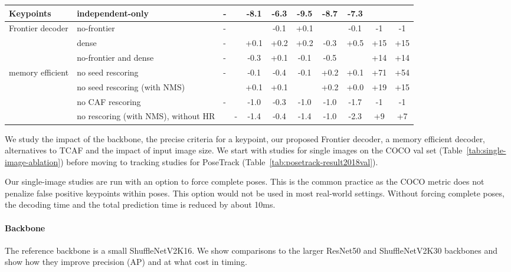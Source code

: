 \documentclass[journal]{IEEEtran}
\newcommand{\hl}[1]{#1}
\begin{document}
\begin{table*}
\begin{tabular}{|l l|H H c c c c c c c|}
    \hline

    Keypoints & independent-only
    & - &  & -8.1 & \hl{-6.3} & \hl{-9.5} & -8.7 & -7.3 &  &  \\

    \hline

    Frontier decoder & no-frontier
    & - &  &  & \hl{-0.1} & \hl{+0.1} &  & -0.1 & -1 & -1 \\
    & dense
    & - &  & +0.1 & \hl{+0.2} & \hl{+0.2} & -0.3 & +0.5 & +15 & +15 \\
    & no-frontier and dense
    & - &  & -0.3 & \hl{+0.1} & \hl{-0.1} & -0.5 &  & +14 & +14 \\

    \hline

    memory efficient & no seed rescoring
    & - &  & -0.1 & \hl{-0.4} & \hl{-0.1} & +0.2 & +0.1 & +71 & +54 \\
    & no seed rescoring (with NMS)
    &  &  & +0.1 & \hl{+0.1} & \hl{} & +0.2 & +0.0 & +19 & +15 \\
    & no CAF rescoring
    & - &  & -1.0 & \hl{-0.3} & \hl{-1.0} & -1.0 & -1.7 & -1 & -1 \\
    & no rescoring (with NMS), without HR
    &  & - & -1.4 & \hl{-0.4} & \hl{-1.4} & -1.0 & -2.3 & +9 & +7 \\

    \hline
  \end{tabular}
\end{table*}


We study the impact of the backbone, the precise criteria for a keypoint,
our proposed Frontier decoder, a memory efficient
decoder, alternatives to TCAF and the impact of input image size.
We start with studies for single images on the COCO val set
(Table~\ref{tab:single-image-ablation}) before moving to
tracking studies for PoseTrack (Table~\ref{tab:posetrack-result2018val}).

Our single-image studies are run with an option to force complete poses. This is the
common practice as the COCO metric does not penalize false positive
keypoints within poses. This option would not be used in most real-world
settings. Without forcing complete poses, the decoding time and
the total prediction time is reduced by about 10ms.

\paragraph{Backbone}
The reference backbone is a small ShuffleNetV2K16. We show comparisons to the
larger ResNet50 and ShuffleNetV2K30 backbones and show how they improve
precision (AP) and at what cost in timing.
\end{document}
